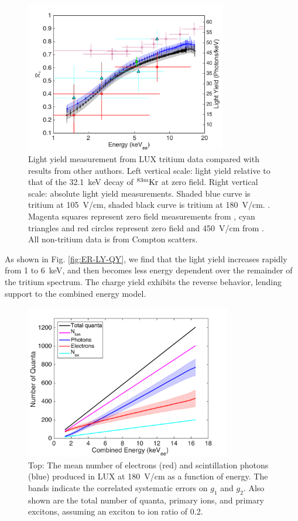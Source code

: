 \begin{figure}[h!]
\includegraphics[width=88mm]{fig/Re_LY_log.png}
\caption{Light yield measurement from LUX tritium data compared with results from other authors. Left vertical scale: light yield relative to that of the 32.1~keV decay of $\rm ^{83m}Kr $ at zero field. Right vertical scale: absolute light yield measurements. Shaded blue curve is tritium at 105~V/cm, shaded black curve is tritium at 180~V/cm. . Magenta squares represent zero field measurements from \cite{Aprile_LY}, cyan triangles and red circles represent zero field and 450~V/cm from \cite{Baudis}. All non-tritium data is from Compton scatters. }
\label{fig:Re_LY}
\end{figure}


As shown in Fig. \ref{fig:ER-LY-QY}, we find that the light yield increases rapidly from 1 to 6~keV, and then becomes less energy dependent over the remainder of the tritium spectrum. The charge yield exhibits the reverse behavior, lending support to the combined energy model. 

\begin{figure}[h!]
\includegraphics[width=90mm]{fig/quanta-vs-energy.png}
\caption{Top: The mean number of electrons (red) and scintillation photons (blue) produced in LUX at 180~V/cm as a function of energy. The bands indicate the correlated systematic errors on $g_1$ and $g_2$. Also shown are the total number of quanta, primary ions, and primary excitons, assuming an exciton to ion ratio of 0.2. }
\label{fig:quanta-vs-energy}
\end{figure}

